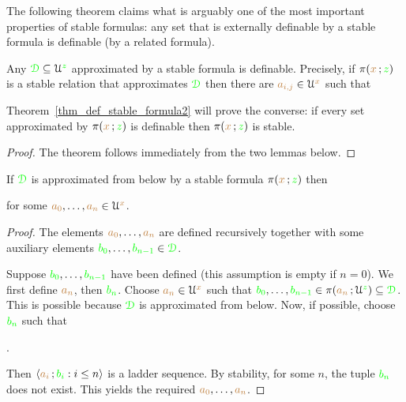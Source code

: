 The following theorem claims what is arguably one of the most important properties of stable formulas: any set that is externally definable by a stable formula is definable (by a related formula).

\begin{theorem}\label{thm_def_stable_formula}
Any ${\color{green}\EuScript D}\subseteq\EuScript U^{\color{green} z}$ approximated by a stable formula is definable.
Precisely, if $\pi({\color{brown} x}\,;{\color{green} z})$ is a stable relation that approximates ${\color{green}\EuScript D}$ then there are ${\color{brown} a_{i,j}}\in\EuScript U^{\color{brown} x}$ such that

\end{theorem}

Theorem~\ref{thm_def_stable_formula2} will prove the converse: if every set approximated by $\pi({\color{brown} x}\,;{\color{green} z})$ is definable then $\pi({\color{brown} x}\,;{\color{green} z})$ is stable.

\begin{proof}
  The theorem follows immediately from the two lemmas below.
\end{proof}

\begin{lemma}
If ${\color{green}\EuScript D}$ is approximated from below by a stable formula $\pi({\color{brown} x}\,;{\color{green} z})$ then


for some ${\color{brown} a_0},\dots,{\color{brown} a_n}\in\EuScript U^{\color{brown} x}$.
\end{lemma}

\begin{proof}
The elements ${\color{brown} a_0},\dots,{\color{brown} a_n}$ are defined recursively together with some auxiliary elements ${\color{green} b_0},\dots,{\color{green} b_{n-1}}\in{\color{green}\EuScript D}$.

Suppose ${\color{green} b_0},\dots,{\color{green} b_{n-1}}$ have been defined (this assumption is empty if $n=0$).
We first define ${\color{brown} a_n}$, then ${\color{green} b_n}$.
Choose ${\color{brown} a_n}\in\EuScript U^{\color{brown} x}$ such that ${\color{green} b_0},\dots,{\color{green} b_{n-1}}\in\pi({\color{brown} a_n}\,;\EuScript U^{\color{green} z})\subseteq{\color{green}\EuScript D}$.
This is possible because ${\color{green}\EuScript D}$ is approximated from below.
Now, if possible, choose ${\color{green} b_n}$ such that

.

Then $\langle{\color{brown}a_i}\,;{\color{green} b_i} : i\le n\rangle$ is a ladder sequence.
By stability, for some $n$, the tuple ${\color{green} b_n}$ does not exist.
This yields the required ${\color{brown} a_0},\dots,{\color{brown} a_n}$.
\end{proof}


